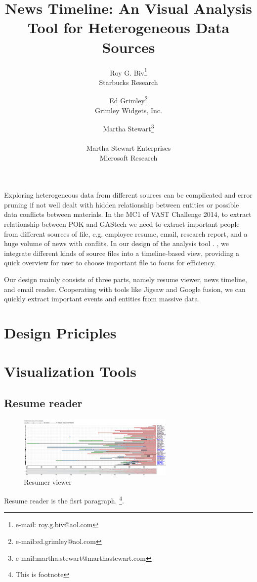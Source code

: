 \documentclass{vgtc}                          %
\title{News Timeline: An Visual Analysis Tool for Heterogeneous Data Sources}
\author{Roy G. Biv\thanks{e-mail: roy.g.biv@aol.com}\\ %
        \scriptsize Starbucks Research %
\and Ed Grimley\thanks{e-mail:ed.grimley@aol.com}\\ %
     \scriptsize Grimley Widgets, Inc. %
\and Martha Stewart\thanks{e-mail:martha.stewart@marthastewart.com}\\ %
     \parbox{1.4in}{\scriptsize \centering Martha Stewart Enterprises \\ Microsoft Research}}
\begin{document}


\maketitle

Exploring heterogeneous data from different sources can be complicated and error pruning if not well dealt with hidden relationship between entities or possible data conflicts between materials. 
In the MC1 of VAST Challenge 2014, to extract relationship between POK and GAStech we need to extract important people from different sources of file, e.g. employee resume, email, research report, and a huge volume of news with conflits. 
In our design of the analysis tool \ourname. , we integrate different kinds of source files into a timeline-based view, providing a quick overview for user to choose important file to focus for efficiency. 
\par
Our design mainly consists of three parts, namely resume viewer, news timeline, and email reader.  Cooperating with tools like Jigsaw and Google fusion, we can quickly extract important events and entities from massive data.


\section{Design Priciples}

\section{Visualization Tools}
\subsection{Resume reader}
\begin{figure}[htb]
  \centering
  \includegraphics[width=3in]{image009.png}
  \caption{Resumer viewer}
\end{figure}
Resume reader is the fisrt paragraph.
\footnote{This is footnote}.
\end{document}
